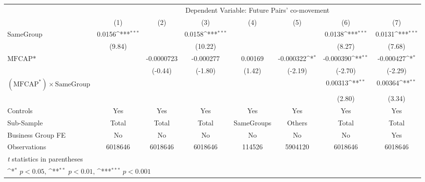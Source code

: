 {
\def\sym#1{\ifmmode^{#1}\else\(^{#1}\)\fi}
\begin{tabular}{l*{7}{c}}
\hline\hline
                &\multicolumn{7}{c}{Dependent Variable: Future Pairs' co-movement}                                                                   \\\cmidrule(lr){2-8}
                &\multicolumn{1}{c}{(1)}         &\multicolumn{1}{c}{(2)}         &\multicolumn{1}{c}{(3)}         &\multicolumn{1}{c}{(4)}         &\multicolumn{1}{c}{(5)}         &\multicolumn{1}{c}{(6)}         &\multicolumn{1}{c}{(7)}         \\
\hline
SameGroup       &   0.0156\sym{***}&                  &   0.0158\sym{***}&                  &                  &   0.0138\sym{***}&   0.0131\sym{***}\\
                &   (9.84)         &                  &  (10.22)         &                  &                  &   (8.27)         &   (7.68)         \\
[1em]
$ \text{MFCAP*} $&                  &-0.0000723         &-0.000277         &  0.00169         &-0.000322\sym{*}  &-0.000390\sym{**} &-0.000427\sym{*}  \\
                &                  &  (-0.44)         &  (-1.80)         &   (1.42)         &  (-2.19)         &  (-2.70)         &  (-2.29)         \\
[1em]
 $ (\text{MFCAP}^*) \times {\text{SameGroup} }  $ &                  &                  &                  &                  &                  &  0.00313\sym{**} &  0.00364\sym{**} \\
                &                  &                  &                  &                  &                  &   (2.80)         &   (3.34)         \\
\hline
Controls        &      Yes         &      Yes         &      Yes         &      Yes         &      Yes         &      Yes         &      Yes         \\
Sub-Sample      &    Total         &    Total         &    Total         &SameGroups         &   Others         &    Total         &    Total         \\
Business Group FE&       No         &       No         &       No         &       No         &       No         &       No         &      Yes         \\
Observations    &  6018646         &  6018646         &  6018646         &   114526         &  5904120         &  6018646         &  6018646         \\
\hline\hline
\multicolumn{8}{l}{\footnotesize \textit{t} statistics in parentheses}\\
\multicolumn{8}{l}{\footnotesize \sym{*} \(p<0.05\), \sym{**} \(p<0.01\), \sym{***} \(p<0.001\)}\\
\end{tabular}
}
